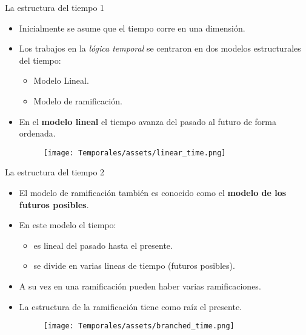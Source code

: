 \documentclass[handout, t, aspectratio=169]{beamer}
\begin{document}
\begin{frame}{La estructura del tiempo 1}
    \begin{itemize}
        \item Inicialmente se asume que el tiempo corre en una dimensión.\pause
        \item Los trabajos en la \textit{lógica temporal} se centraron en dos modelos estructurales del tiempo:\pause
        \begin{itemize}
            \item Modelo Lineal.\pause
            \item Modelo de ramificación.\pause
        \end{itemize}
        
        \item En el \textbf{modelo lineal} el tiempo avanza del pasado al futuro de forma ordenada.\pause
        \begin{figure}
            \centering
           \texttt{[image: Temporales/assets/linear\_time.png]}
        \end{figure}
    \end{itemize}
\end{frame}

\begin{frame}{La estructura del tiempo 2}
    \begin{itemize}
        \item El modelo de ramificación también es conocido como el \textbf{modelo de los futuros posibles}.\pause
        \item En este modelo el tiempo:\pause
        \begin{itemize}
            \item es lineal del pasado hasta el presente.\pause
            \item se divide en varias lineas de tiempo (futuros posibles).\pause
        \end{itemize}
        \item A su vez en una ramificación pueden haber varias ramificaciones.\pause
        \item La estructura de la ramificación tiene como raíz el presente.\pause
        \begin{figure}
            \centering
           \texttt{[image: Temporales/assets/branched\_time.png]}
        \end{figure}
    \end{itemize}
\end{frame}
\end{document}
